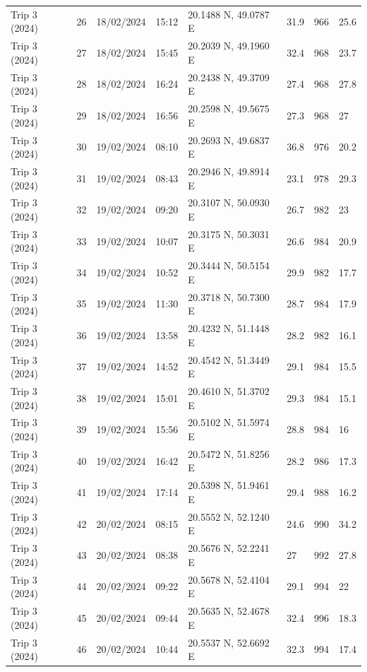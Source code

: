 \begin{scriptsize}
\begin{longtable}{llllllll}
Trip 3 (2024) & 26 & 18/02/2024 & 15:12 & 20.1488 N, 49.0787 E & 31.9 & 966 & 25.6 \\
Trip 3 (2024) & 27 & 18/02/2024 & 15:45 & 20.2039 N, 49.1960 E & 32.4 & 968 & 23.7 \\
Trip 3 (2024) & 28 & 18/02/2024 & 16:24 & 20.2438 N, 49.3709 E & 27.4 & 968 & 27.8 \\
Trip 3 (2024) & 29 & 18/02/2024 & 16:56 & 20.2598 N, 49.5675 E & 27.3 & 968 & 27 \\
Trip 3 (2024) & 30 & 19/02/2024 & 08:10 & 20.2693 N, 49.6837 E & 36.8 & 976 & 20.2 \\
Trip 3 (2024) & 31 & 19/02/2024 & 08:43 & 20.2946 N, 49.8914 E & 23.1 & 978 & 29.3 \\
Trip 3 (2024) & 32 & 19/02/2024 & 09:20 & 20.3107 N, 50.0930 E & 26.7 & 982 & 23 \\
Trip 3 (2024) & 33 & 19/02/2024 & 10:07 & 20.3175 N, 50.3031 E & 26.6 & 984 & 20.9 \\
Trip 3 (2024) & 34 & 19/02/2024 & 10:52 & 20.3444 N, 50.5154 E & 29.9 & 982 & 17.7 \\
Trip 3 (2024) & 35 & 19/02/2024 & 11:30 & 20.3718 N, 50.7300 E & 28.7 & 984 & 17.9 \\
Trip 3 (2024) & 36 & 19/02/2024 & 13:58 & 20.4232 N, 51.1448 E & 28.2 & 982 & 16.1 \\
Trip 3 (2024) & 37 & 19/02/2024 & 14:52 & 20.4542 N, 51.3449 E & 29.1 & 984 & 15.5 \\
Trip 3 (2024) & 38 & 19/02/2024 & 15:01 & 20.4610 N, 51.3702 E & 29.3 & 984 & 15.1 \\
Trip 3 (2024) & 39 & 19/02/2024 & 15:56 & 20.5102 N, 51.5974 E & 28.8 & 984 & 16 \\
Trip 3 (2024) & 40 & 19/02/2024 & 16:42 & 20.5472 N, 51.8256 E & 28.2 & 986 & 17.3 \\
Trip 3 (2024) & 41 & 19/02/2024 & 17:14 & 20.5398 N, 51.9461 E & 29.4 & 988 & 16.2 \\
Trip 3 (2024) & 42 & 20/02/2024 & 08:15 & 20.5552 N, 52.1240 E & 24.6 & 990 & 34.2 \\
Trip 3 (2024) & 43 & 20/02/2024 & 08:38 & 20.5676 N, 52.2241 E & 27 & 992 & 27.8 \\
Trip 3 (2024) & 44 & 20/02/2024 & 09:22 & 20.5678 N, 52.4104 E & 29.1 & 994 & 22 \\
Trip 3 (2024) & 45 & 20/02/2024 & 09:44 & 20.5635 N, 52.4678 E & 32.4 & 996 & 18.3 \\
Trip 3 (2024) & 46 & 20/02/2024 & 10:44 & 20.5537 N, 52.6692 E & 32.3 & 994 & 17.4 \\

\end{longtable}
\end{scriptsize}
